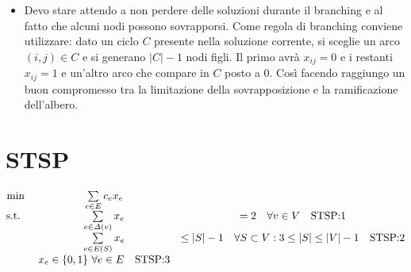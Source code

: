 \begin{itemize}
	\item Devo stare attendo a non perdere delle soluzioni durante il branching e al fatto che alcuni nodi possono sovrapporsi. 
	Come regola di branching conviene utilizzare: dato un ciclo $C$ presente nella soluzione corrente, si sceglie un arco $(i,j) \in C$ e si generano $|C| - 1 $ nodi figli. Il primo avrà $x_{ij} = 0$ e i restanti $x_{ij} =1$ e un'altro arco che compare in $C$ posto a 0. Così facendo raggiungo un buon compromesso tra la limitazione della sovrapposizione e la ramificazione dell'albero.
\end{itemize}

\section{STSP}

$$
\begin{matrix}
\min \: & \sum\limits_{e \in E} c_ex_e &\\
\text{s.t. } \:  & \sum\limits_{e \in \varDelta(v) } x_e &=2 \quad \forall v \in V \quad \text{STSP:1} \\
        & \sum\limits_{e \in E(S)} x_e & \leq  |S| -1 \quad \forall S \subset V : 3 \leq |S| \leq |V| - 1 \quad \text{STSP:2} \\
        & x_e \in \{0,1\}\  \forall e \in E \quad \text{STSP:3}
\end{matrix}
$$

